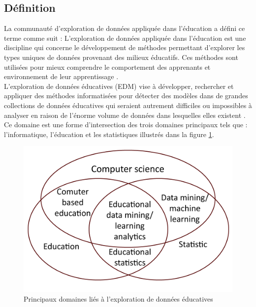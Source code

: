 \subsection{Définition}
La communauté d'exploration de données appliquée dans l'éducation a défini ce terme comme suit : L'exploration de données appliquée dans l'éducation est une discipline qui concerne le développement de méthodes permettant d'explorer les types uniques de données provenant des milieux éducatifs. Ces méthodes sont utilisées pour mieux comprendre le comportement des apprenants et environnement de leur apprentissage \cite{state_of_educational_data_mining_in_2009_a_review_and_future_visions}. \\
L'exploration de données éducatives (EDM) vise à développer, rechercher et appliquer des méthodes informatisées pour détecter des modèles dans de grandes collections de données éducatives qui seraient autrement difficiles ou impossibles à analyser en raison de l'énorme volume de données dans lesquelles elles existent \cite{Educational_data_mining_a_survey_from_1995_to_2005}. \\
Ce domaine est une forme d'intersection des trois domaines principaux tels que : l'informatique, l'éducation et les statistiques illustrés dans la figure \ref{domaine_exploration_données}.

\begin{figure}[H]
	\begin{center}
		\includegraphics[scale=0.3]{images/chapitre1/Principaux domaines liés à l'exploration de données éducatives}
	\end{center}
  \caption{Principaux domaines liés à l'exploration de données éducatives}
  \label{domaine_exploration_données}
\end{figure}

